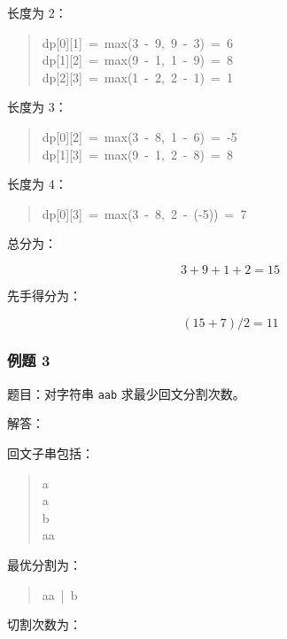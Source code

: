 \documentclass[UTF8,zihao=-4]{ctexart}
\begin{document}
长度为 2：

\begin{quote}
\small\ttfamily\raggedright
\relax dp[0][1]\ =\ max(3\ -\ 9,\ 9\ -\ 3)\ =\ 6\\
\relax dp[1][2]\ =\ max(9\ -\ 1,\ 1\ -\ 9)\ =\ 8\\
\relax dp[2][3]\ =\ max(1\ -\ 2,\ 2\ -\ 1)\ =\ 1\\
\end{quote}

长度为 3：

\begin{quote}
\small\ttfamily\raggedright
\relax dp[0][2]\ =\ max(3\ -\ 8,\ 1\ -\ 6)\ =\ -5\\
\relax dp[1][3]\ =\ max(9\ -\ 1,\ 2\ -\ 8)\ =\ 8\\
\end{quote}

长度为 4：

\begin{quote}
\small\ttfamily\raggedright
\relax dp[0][3]\ =\ max(3\ -\ 8,\ 2\ -\ (-5))\ =\ 7\\
\end{quote}

总分为：

\[3 + 9 + 1 + 2 = 15\]

先手得分为：

\[(15 + 7) / 2 = 11\]

\subsubsection*{例题 3}

题目：对字符串 \texttt{aab} 求最少回文分割次数。

解答：

回文子串包括：

\begin{quote}
\small\ttfamily\raggedright
\relax a\\
\relax a\\
\relax b\\
\relax aa\\
\end{quote}

最优分割为：

\begin{quote}
\small\ttfamily\raggedright
\relax aa\ |\ b\\
\end{quote}

切割次数为：
\end{document}
